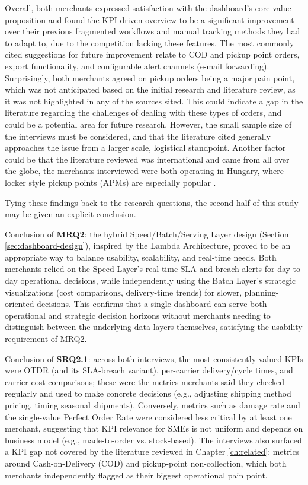 \documentclass{imc-inf}
\begin{document}
Overall, both merchants expressed satisfaction with the dashboard's core value proposition and found the KPI-driven overview to be a significant improvement over their previous fragmented workflows and manual tracking methods they had to adapt to, due to the competition lacking these features.
The most commonly cited suggestions for future improvement relate to COD and pickup point orders, export functionality, and configurable alert channels (e-mail forwarding).
Surprisingly, both merchants agreed on pickup orders being a major pain point, which was not anticipated based on the initial research and literature review, as it was not highlighted in any of the sources sited.
This could indicate a gap in the literature regarding the challenges of dealing with these types of orders, and could be a potential area for future research.
However, the small sample size of the interviews must be considered, and that the literature cited generally approaches the issue from a larger scale, logistical standpoint.
Another factor could be that the literature reviewed was international and came from all over the globe, the merchants interviewed were both operating in Hungary, where locker style pickup points (APMs) are especially popular \cite{gkidEvertekelesEsLogisztika2020}.

Tying these findings back to the research questions, the second half of this study may be given an explicit conclusion.

Conclusion of \textbf{MRQ2}: the hybrid Speed/Batch/Serving Layer design (Section \ref{sec:dashboard-design}), inspired by the Lambda Architecture, proved to be an appropriate way to balance usability, scalability, and real-time needs. Both merchants relied on the Speed Layer's real-time SLA and breach alerts for day-to-day operational decisions, while independently using the Batch Layer's strategic visualizations (cost comparisons, delivery-time trends) for slower, planning-oriented decisions. This confirms that a single dashboard can serve both operational and strategic decision horizons without merchants needing to distinguish between the underlying data layers themselves, satisfying the usability requirement of MRQ2.

Conclusion of \textbf{SRQ2.1}: across both interviews, the most consistently valued KPIs were OTDR (and its SLA-breach variant), per-carrier delivery/cycle times, and carrier cost comparisons; these were the metrics merchants said they checked regularly and used to make concrete decisions (e.g., adjusting shipping method pricing, timing seasonal shipments). Conversely, metrics such as damage rate and the single-value Perfect Order Rate were considered less critical by at least one merchant, suggesting that KPI relevance for SMEs is not uniform and depends on business model (e.g., made-to-order vs. stock-based). The interviews also surfaced a KPI gap not covered by the literature reviewed in Chapter \ref{ch:related}: metrics around Cash-on-Delivery (COD) and pickup-point non-collection, which both merchants independently flagged as their biggest operational pain point.
\end{document}
